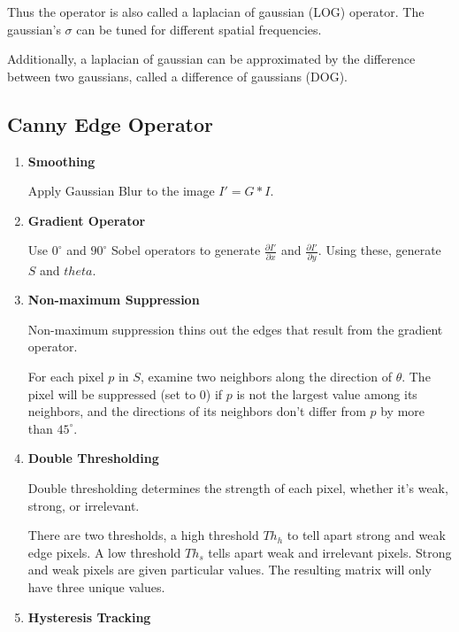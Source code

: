 \documentclass{article}
\begin{document}
\begin{multicols}{3}
Thus the operator is also called a laplacian of gaussian (LOG) operator. The gaussian's $\sigma$ can be tuned for different spatial frequencies.

Additionally, a laplacian of gaussian can be approximated by the difference between two gaussians, called a difference of gaussians (DOG).

\subsection{Canny Edge Operator}

\begin{enumerate}
\itemsep0em
\item \textbf{Smoothing}

Apply Gaussian Blur to the image $I' = G*I$.

\item \textbf{Gradient Operator}

Use $0^{\circ}$ and $90^{\circ}$ Sobel operators to generate $\frac{\partial I'}{\partial x}$ and $\frac{\partial I'}{\partial y}$. Using these, generate $S$ and $theta$.

\item \textbf{Non-maximum Suppression}

Non-maximum suppression thins out the edges that result from the gradient operator.

For each pixel $p$ in $S$, examine two neighbors along the direction of $\theta$. The pixel will be suppressed (set to 0) if $p$ is not the largest value among its neighbors, and the directions of its neighbors don't differ from $p$ by more than $45^{\circ}$.

\item \textbf{Double Thresholding}

Double thresholding determines the strength of each pixel, whether it's weak, strong, or irrelevant.

There are two thresholds, a high threshold $Th_h$ to tell apart strong and weak edge pixels. A low threshold $Th_s$ tells apart weak and irrelevant pixels. Strong and weak pixels are given particular values. The resulting matrix will only have three unique values.

\item \textbf{Hysteresis Tracking}



\end{enumerate}
\end{multicols}
\end{document}
